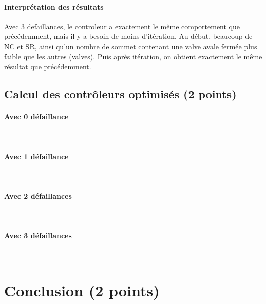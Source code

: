 \documentclass[a4paper]{book}
\begin{document}
\paragraph{Interprétation des résultats}
Avec 3 defaillances, le controleur a exactement le même comportement que précédemment, mais il y a besoin de moins d'itération. 
Au début, beaucoup de NC et SR, ainsi qu'un nombre de sommet contenant une valve avale fermée plus faible que les autres (valves).
Puis après itération, on obtient exactement le même résultat que précédemment.

\subsection{Calcul des contrôleurs optimisés (2 points)}
\paragraph{Avec 0 défaillance}\ \\


\paragraph{Avec 1 défaillance}\ \\


\paragraph{Avec 2 défaillances}\ \\


\paragraph{Avec 3 défaillances}\ \\


\section{Conclusion (2 points)}
\end{document}
